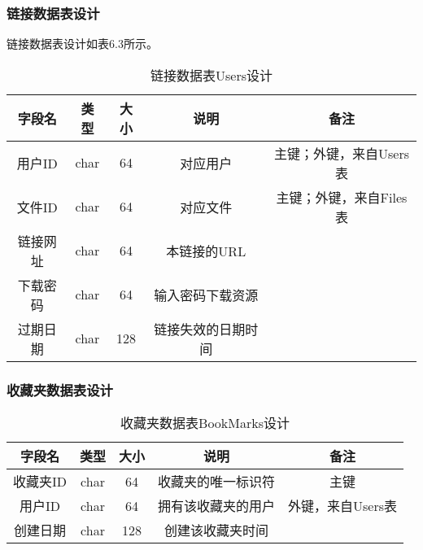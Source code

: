 \subsubsection{链接数据表设计}
链接数据表设计如表6.3所示。
\begin{table}[htbp]
\centering
\caption{链接数据表Users设计} \label{tab:link-database}
\begin{tabular}{|c|c|c|c|c|}
    \hline
    字段名 & 类型 & 大小 & 说明 & 备注 \\
    \hline
    用户ID & char & 64 & 对应用户 & 主键；外键，来自Users表\\
    \hline
    文件ID & char & 64 & 对应文件 & 主键；外键，来自Files表\\
    \hline
    链接网址 & char & 64 & 本链接的URL & \\
    \hline
    下载密码 & char & 64 & 输入密码下载资源 & \\
    \hline
    过期日期 & char & 128 & 链接失效的日期时间 & \\
    \hline
\end{tabular}
\end{table}

\subsubsection{收藏夹数据表设计}
\begin{table}[htbp]
\centering
\caption{收藏夹数据表BookMarks设计} \label{tab:bookmarks-database}
\begin{tabular}{|c|c|c|c|c|}
    \hline
    字段名 & 类型 & 大小 & 说明 & 备注 \\
    \hline
    收藏夹ID & char & 64 & 收藏夹的唯一标识符 & 主键\\
    \hline
    用户ID & char & 64 & 拥有该收藏夹的用户 & 外键，来自Users表\\
    \hline
    创建日期 & char & 128 & 创建该收藏夹时间 & \\
    \hline
\end{tabular}
\end{table}

